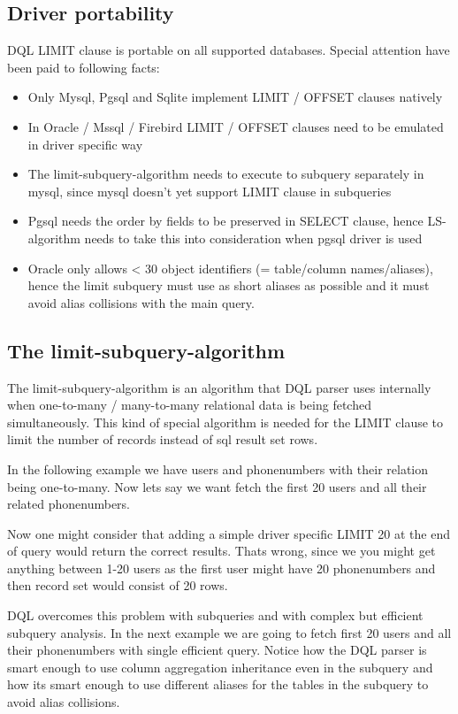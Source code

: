 \documentclass[11pt,a4paper]{report}
\begin{document}
\subsection{Driver portability}
DQL LIMIT clause is portable on all supported databases. Special attention have been paid to following facts:

\begin{itemize}
\item{Only Mysql, Pgsql and Sqlite implement LIMIT / OFFSET clauses natively}
\item{In Oracle / Mssql / Firebird LIMIT / OFFSET clauses need to be emulated in driver specific way}
\item{The limit-subquery-algorithm needs to execute to subquery separately in mysql, since mysql doesn't yet support LIMIT clause in subqueries}
\item{Pgsql needs the order by fields to be preserved in SELECT clause, hence LS-algorithm needs to take this into consideration when pgsql driver is used}
\item{Oracle only allows < 30 object identifiers (= table/column names/aliases), hence the limit subquery must use as short aliases as possible and it must avoid alias collisions with the main query.}
\end{itemize}
\subsection{The limit-subquery-algorithm}
The limit-subquery-algorithm is an algorithm that DQL parser uses internally when one-to-many / many-to-many relational data is being fetched simultaneously. This kind of special algorithm is needed for the LIMIT clause to limit the number of records instead of sql result set rows.

In the following example we have users and phonenumbers with their relation being one-to-many. Now lets say we want fetch the first 20 users and all their related phonenumbers.

Now one might consider that adding a simple driver specific LIMIT 20 at the end of query would return the correct results. Thats wrong, since we you might get anything between 1-20 users as the first user might have 20 phonenumbers and then record set would consist of 20 rows.

DQL overcomes this problem with subqueries and with complex but efficient subquery analysis. In the next example we are going to fetch first 20 users and all their phonenumbers with single efficient query. Notice how the DQL parser is smart enough to use column aggregation inheritance even in the subquery and how its smart enough to use different aliases for the tables in the subquery to avoid alias collisions.
\end{document}
